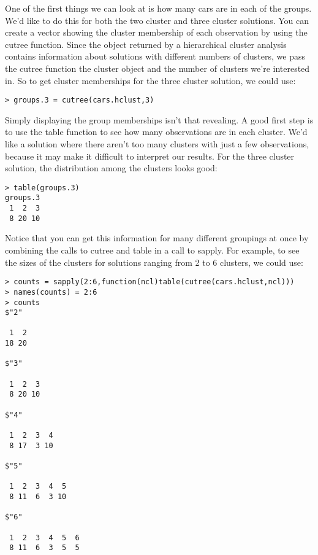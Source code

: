 {One of the first things we can look at is how many cars are in each of the groups. We'd like to do this for both the two cluster and three cluster solutions. You can create a vector showing the cluster membership of each observation by using the cutree function. Since the object returned by a hierarchical cluster analysis contains information about solutions with different numbers of clusters, we pass the cutree function the cluster object and the number of clusters we're interested in. So to get cluster memberships for the three cluster solution, we could use:
\begin{framed}
\begin{verbatim}
> groups.3 = cutree(cars.hclust,3)
\end{verbatim}
\end{framed}
Simply displaying the group memberships isn't that revealing. A good first step is to use the table function to see how many observations are in each cluster. We'd like a solution where there aren't too many clusters with just a few observations, because it may make it difficult to interpret our results. For the three cluster solution, the distribution among the clusters looks good:
\begin{framed}
\begin{verbatim}
> table(groups.3)
groups.3
 1  2  3
 8 20 10
\end{verbatim}
\end{framed}
Notice that you can get this information for many different groupings at once by combining the calls to cutree and table in a call to sapply. For example, to see the sizes of the clusters for solutions ranging from 2 to 6 clusters, we could use:

\begin{framed}
\begin{verbatim}
> counts = sapply(2:6,function(ncl)table(cutree(cars.hclust,ncl)))
> names(counts) = 2:6
> counts
$"2"

 1  2
18 20

$"3"

 1  2  3
 8 20 10

$"4"

 1  2  3  4
 8 17  3 10

$"5"

 1  2  3  4  5
 8 11  6  3 10

$"6"

 1  2  3  4  5  6
 8 11  6  3  5  5


\end{verbatim}
\end{framed}}
